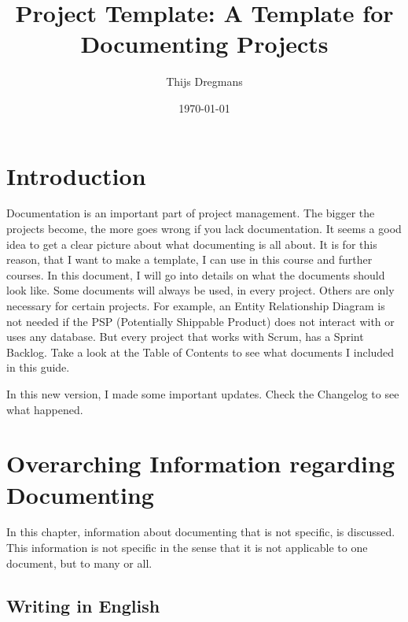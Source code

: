 \documentclass[10pt]{report}
\title{Project Template: A Template for Documenting Projects}
\date{\today}
\author{Thijs Dregmans}
\begin{document}
\maketitle

\chapter{Introduction}
\thispagestyle{fancy}

Documentation is an important part of project management. The bigger the projects become, the more goes wrong if you lack documentation. It seems a good idea to get a clear picture about what documenting is all about. It is for this reason, that I want to make a template, I can use in this course and further courses. In this document, I will go into details on what the documents should look like. Some documents will always be used, in every project. Others are only necessary for certain projects. For example, an Entity Relationship Diagram is not needed if the PSP (Potentially Shippable Product) does not interact with or uses any database. But every project that works with Scrum, has a Sprint Backlog. Take a look at the Table of Contents to see what documents I included in this guide.

In this new version, I made some important updates. Check the Changelog to see what happened.

\newpage

\tableofcontents

\newpage

\chapter{Overarching Information regarding Documenting}
\thispagestyle{fancy}

In this chapter, information about documenting that is not specific, is discussed. This information is not specific in the sense that it is not applicable to one document, but to many or all.

\medskip
\minitoc

\newpage

\section{Writing in English}
\end{document}
